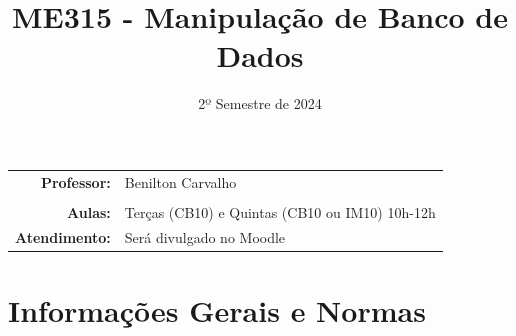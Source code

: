 \documentclass[paper=letter, fontsize=12pt]{scrartcl} %
\title{\normalfont \LARGE ME315 - Manipulação de Banco de Dados}
\subtitle{2º Semestre de 2024}
\author{}
\date{}
\begin{document}
\maketitle

\vspace{-1.5cm}

\noindent
\begin{tabular}{rl}
\textbf{Professor:} & 	 Benilton Carvalho \\
\\
\textbf{Aulas:} & Terças (CB10) e Quintas (CB10 ou IM10) 10h-12h \\
\textbf{Atendimento:} & Será divulgado no Moodle\\

\end{tabular}

\section{Informações Gerais e Normas}
\end{document}
